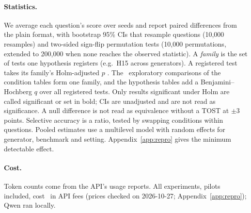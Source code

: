 \paragraph{Statistics.}
We average each question's score over seeds and report paired differences from the plain format, with
bootstrap 95\% CIs that resample questions (10,000 resamples) and two-sided sign-flip permutation tests
\citep{efron1993bootstrap,dror2018hitchhiker} (10,000 permutations, extended to 200,000 when none reaches the observed
statistic). A \emph{family} is the set of tests one hypothesis registers (e.g.\ H15 across generators). A registered
test takes its family's Holm-adjusted $p$ \citep{holm1979simple}. The \nExploratory\ exploratory comparisons of the
condition tables form one family, and the hypothesis tables add a Benjamini--Hochberg $q$ over all registered tests.
Only results significant under Holm are called significant or set in bold; CIs are unadjusted and are not read as
significance. A null difference is not read
as equivalence without a TOST \citep{lakens2017equivalence} at $\pm$3 points. Selective accuracy is a ratio, tested by swapping conditions within questions. Pooled estimates use a multilevel model with random
effects for generator, benchmark and setting. Appendix~\ref{app:repro} gives the minimum detectable effect.

\paragraph{Cost.}
Token counts come from the API's usage reports. All experiments, pilots included, cost \totalSpend\ in API fees
(prices checked on 2026-10-27; Appendix~\ref{app:repro}); Qwen ran locally.
